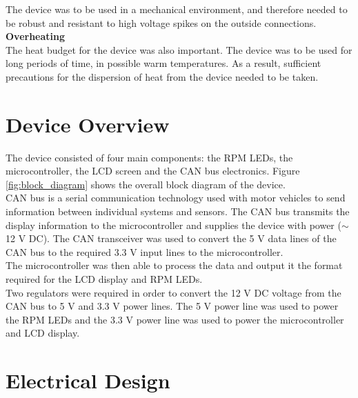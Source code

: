 \documentclass[a4paper,12pt]{article}
\begin{document}
The device was to be used in a mechanical environment, and therefore needed to be robust and resistant to high voltage spikes on the outside connections. \\

\textbf{Overheating} \\

The heat budget for the device was also important. The device was to be used for long periods of time, in possible warm temperatures. As a result, sufficient precautions for the dispersion of heat from the device needed to be taken.


\newpage
\section{Device Overview}
\label{sec:device_overview}

The device consisted of four main components: the RPM LEDs, the microcontroller, the LCD screen and the CAN bus electronics. Figure \ref{fig:block_diagram} shows the overall block diagram of the device. \\



CAN bus is a serial communication technology used with motor vehicles to send information between individual systems and sensors. The CAN bus transmits the display information to the microcontroller and supplies the device with power ($\sim$ 12 V DC). The CAN transceiver was used to convert the 5 V data lines of the CAN bus to the required 3.3 V input lines to the microcontroller. \\

The microcontroller was then able to process the data and output it the format required for the LCD display and RPM LEDs. \\

Two regulators were required in order to convert the 12 V DC voltage from the CAN bus to 5 V and 3.3 V power lines. The 5 V power line was used to power the RPM LEDs and the 3.3 V power line was used to power the microcontroller and LCD display. \\


\newpage
\section{Electrical Design}
\label{sec:electrical_design}
\end{document}
